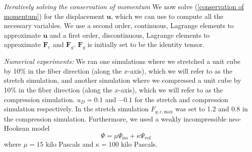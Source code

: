 \emph{Iteratively solving the conservation of momentum}
We now solve (\ref{conservation of momentum}) for the displacement $\mathbf{u}$, which we can use to compute all the necessary variables. We use a second order, continuous, Lagrange elements to approximate $\mathbf{u}$ and a first order, discontinuous, Lagrange elements to approximate $\mathbf{F}_e$ and $\mathbf{F}_g$. $\mathbf{F}_g$ is initially set to be the identity tensor. \par
\emph{Numerical experiments:} We ran one simulations where we stretched a unit cube by 10\% in the fiber direction (along the $x$-axis), which we will refer to as the stretch simulation, and another simulation where we compressed a unit cube by 10\% in the fiber direction (along the $x$-axis), which we will refer to as the compression simulation. $u_D = 0.1$ and $-0.1$ for the stretch and compression simulation respectively. In the stretch simulation $F_{g,c,\mathrm{max}}$ was set to 1.2 and 0.8 in the compression simulation. Furthermore, we used a weakly incompressible neo-Hookean model
\begin{equation*}
    \Psi = \mu\Psi_\text{iso} + \kappa\Psi_\text{vol}
\end{equation*}
where $\mu = 15$ kilo Pascals and $\kappa = 100$ kilo Pascals.
